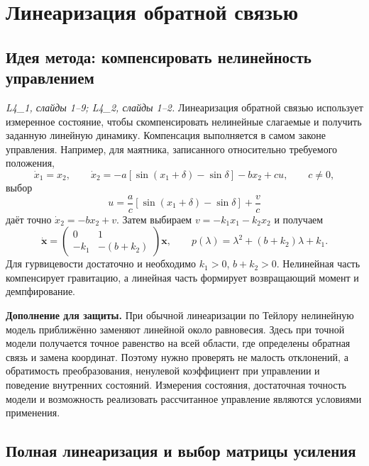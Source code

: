 \section{Линеаризация обратной связью}
\label{sec:linearization}

\subsection{Идея метода: компенсировать нелинейность управлением}

\textit{L4\_1, слайды 1--9; L4\_2, слайды 1--2.}
Линеаризация обратной связью использует измеренное состояние, чтобы
скомпенсировать нелинейные слагаемые и получить заданную линейную
динамику. Компенсация выполняется в самом законе управления.
Например, для маятника, записанного относительно требуемого положения,
\[
 \dot x_1=x_2,\qquad
 \dot x_2=-a[\sin(x_1+\delta)-\sin\delta]-bx_2+cu,
 \qquad c\ne0,
\]
выбор
\[
 u=\frac{a}{c}[\sin(x_1+\delta)-\sin\delta]+\frac{v}{c}
\]
даёт точно $\dot x_2=-bx_2+v$. Затем выбираем
$v=-k_1x_1-k_2x_2$ и получаем
\[
 \dot{\bm x}=\begin{pmatrix}0&1\\-k_1&-(b+k_2)\end{pmatrix}\bm x,
 \qquad
 p(\lambda)=\lambda^2+(b+k_2)\lambda+k_1.
\]
Для гурвицевости достаточно и необходимо $k_1>0$, $b+k_2>0$.
Нелинейная часть компенсирует гравитацию, а линейная часть формирует
возвращающий момент и демпфирование.

\textbf{Дополнение для защиты.} При обычной линеаризации по Тейлору
нелинейную модель приближённо заменяют линейной около равновесия.
Здесь при точной модели получается точное равенство на всей области,
где определены обратная связь и замена координат. Поэтому нужно
проверять не малость отклонений, а обратимость преобразования,
ненулевой коэффициент при управлении и поведение внутренних состояний.
Измерения состояния, достаточная точность модели и возможность
реализовать рассчитанное управление являются условиями применения.

\subsection{Полная линеаризация и выбор матрицы усиления}

